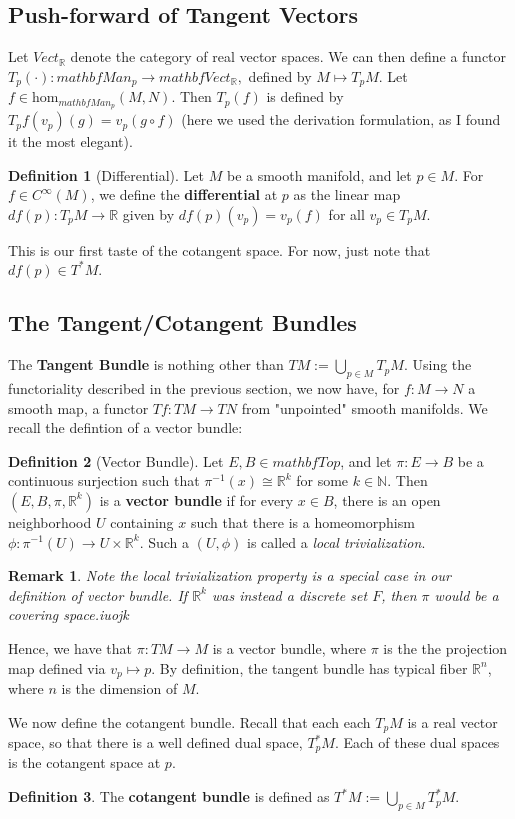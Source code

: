 \documentclass{article}
\newtheorem{remark}{Remark}
\theoremstyle{definition}
\newtheorem{defn}{Definition}[section]
\newcommand{\N}{\mathbb{N}}
\newcommand{\R}{\mathbb{R}}
\newcommand{\cat}{mathbf}
\begin{document}
\subsection{Push-forward of Tangent Vectors}
Let $Vect_{\R}$ denote the category of real vector spaces. We can then define a functor $T_{p}(\cdot):\cat{Man}_{p}\rightarrow\cat{Vect}_{\R},$ defined by $M\mapsto T_{p}M$. Let $f\in\text{hom}_{\cat{Man}_{p}}(M,N)$. Then $T_{p}(f)$ is defined by $T_{p}f(v_{p})(g)=v_{p}(g\circ f)$ (here we used the derivation formulation, as I found it the most elegant).
\begin{defn}[Differential]
Let $M$ be a smooth manifold, and let $p\in M$. For $f\in C^{\infty}(M)$, we define the \textbf{differential} at $p$ as the linear map $df(p):T_{p}M\rightarrow\R$ given by $df(p)(v_{p})=v_{p}(f)$ for all $v_{p}\in T_{p}M$.
\end{defn}
This is our first taste of the cotangent space. For now, just note that $df(p)\in T^{\ast}M.$
\subsection{The Tangent/Cotangent Bundles}
The \textbf{Tangent Bundle} is nothing other than $TM:=\bigcup_{p\in M}T_{p}M.$ Using the functoriality described in the previous section, we now have, for $f:M\rightarrow N$ a smooth map, a functor $Tf:TM\rightarrow TN$ from "unpointed" smooth manifolds. We recall the defintion of a vector bundle:
\begin{defn}[Vector Bundle]
Let $E,B\in\cat{Top}$, and let $\pi:E\rightarrow B$ be a continuous surjection such that $\pi^{-1}(x)\cong\R^{k}$ for some $k\in\N$. Then $(E,B,\pi,\R^{k})$ is a \textbf{vector bundle} if for every $x\in B$, there is an open neighborhood $U$ containing $x$ such that there is a homeomorphism $\phi:\pi^{-1}(U)\rightarrow U\times\R^{k}.$ Such a $(U,\phi)$ is called a \textit{local trivialization}.
\end{defn}
\begin{remark}
Note the local trivialization property is a special case in our definition of vector bundle. If $\mathbb{R}^k$ was instead a discrete set $F$, then $\pi$ would be a covering space.iuojk
\end{remark}
Hence, we have that $\pi:TM\rightarrow M$ is a vector bundle, where $\pi$ is the the projection map defined via $v_{p}\mapsto p$. By definition, the tangent bundle has typical fiber $\R^{n}$, where $n$ is the dimension of $M$.

We now define the cotangent bundle. Recall that each each $T_{p}M$ is a real vector space, so that there is a well defined dual space, $T_{p}^{*}M$. Each of these dual spaces is the cotangent space at $p$. 
\begin{defn}
The \textbf{cotangent bundle} is defined as $T^{*}M:=\bigcup_{p\in M}T_{p}^{*}M.$
\end{defn}
\end{document}
